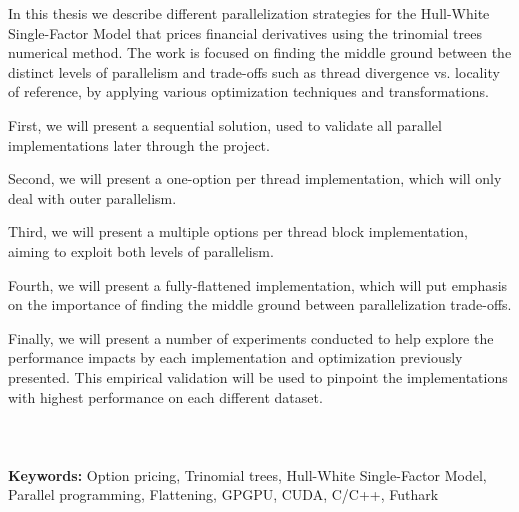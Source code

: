 In this thesis we describe different parallelization strategies for the Hull-White Single-Factor Model that prices financial derivatives using the trinomial trees numerical method. The work is focused on finding the middle ground between the distinct levels of parallelism and trade-offs such as thread divergence vs. locality of reference, by applying various optimization techniques and transformations. 

First, we will present a sequential solution, used to validate all parallel implementations later through the project.

Second, we will present a one-option per thread implementation, which will only deal with outer parallelism.

Third, we will present a multiple options per thread block implementation, aiming to exploit both levels of parallelism. 

Fourth, we will present a fully-flattened implementation, which will put emphasis on the importance of finding the middle ground between parallelization trade-offs. 

Finally, we will present a number of experiments conducted to help explore the performance impacts by each implementation and optimization previously presented. This empirical validation will be used to pinpoint the implementations with highest performance on each different dataset.   
\\\\\\\\
\noindent
\textbf{Keywords:}
Option pricing, Trinomial trees, Hull-White Single-Factor Model, Parallel programming, Flattening, GPGPU, CUDA, C/C++, Futhark